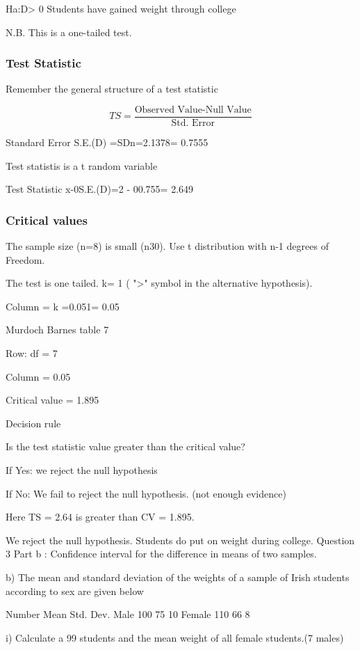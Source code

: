 \documentclass[12pt]{report}
\begin{document}
Ha:D> 0    Students have  gained weight through college


N.B. This is a one-tailed test.

\subsubsection{Test Statistic}

Remember the general structure of a test statistic

\[TS =  \frac{\mbox{Observed Value-Null Value}}{\mbox{Std. Error}} \]



Standard Error		S.E.(D) =SDn=2.1378= 0.7555

Test statistis is a t random variable

Test Statistic		x-0S.E.(D)=2 - 00.755= 2.649


\subsubsection{Critical values}

The sample size (n=8) is small (n30). Use t distribution with n-1 degrees of Freedom.


The test is one tailed.  k= 1  ( ">" symbol in the alternative hypothesis).


Column = k =0.051= 0.05


Murdoch Barnes table 7


Row: df = 7

Column = 0.05

Critical value =  1.895    

Decision rule


Is the test statistic value greater than the critical value?

If Yes: we reject the null hypothesis

If No: We fail to reject the null hypothesis. (not enough evidence)


Here TS = 2.64  is greater than CV = 1.895.


We reject the null hypothesis. Students do put on weight during college. 
Question 3 Part b : Confidence interval for the difference in means of two samples.

b) The mean and standard deviation of the weights of a sample of Irish students according to sex are given below


Number
Mean
Std. Dev.
Male
100
75
10
Female
110
66
8

i)        Calculate a 99%
students and the mean weight of all female students.(7 males)
\end{document}
